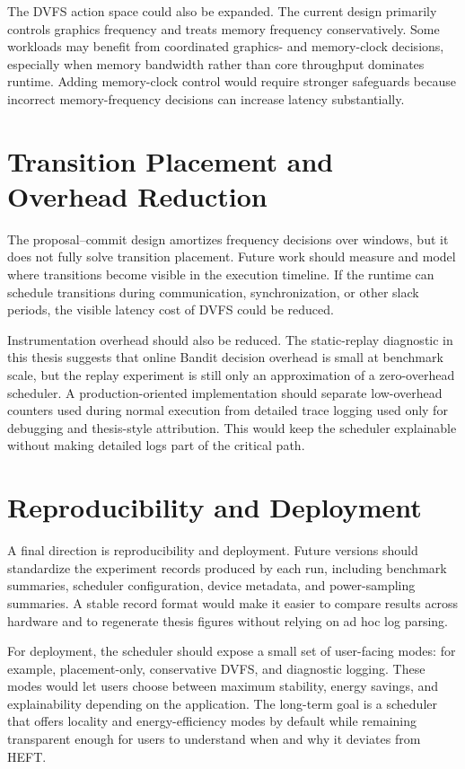 The DVFS action space could also be expanded. The current design primarily
controls graphics frequency and treats memory frequency conservatively. Some
workloads may benefit from coordinated graphics- and memory-clock decisions,
especially when memory bandwidth rather than core throughput dominates
runtime. Adding memory-clock control would require stronger safeguards because
incorrect memory-frequency decisions can increase latency substantially.

\section{Transition Placement and Overhead Reduction}
\label{sec:future-overhead}

The proposal--commit design amortizes frequency decisions over windows, but it
does not fully solve transition placement. Future work should measure and model
where transitions become visible in the \CUDASTF{} execution timeline. If the
runtime can schedule transitions during communication, synchronization, or
other slack periods, the visible latency cost of DVFS could be reduced.

Instrumentation overhead should also be reduced. The static-replay diagnostic
in this thesis suggests that online Bandit decision overhead is small at
benchmark scale, but the replay experiment is still only an approximation of a
zero-overhead scheduler. A production-oriented implementation should separate
low-overhead counters used during normal execution from detailed trace logging
used only for debugging and thesis-style attribution. This would keep the
scheduler explainable without making detailed logs part of the critical path.

\section{Reproducibility and Deployment}
\label{sec:future-reproducibility}

A final direction is reproducibility and deployment. Future versions should
standardize the experiment records produced by each run, including benchmark
summaries, scheduler configuration, device metadata, and power-sampling
summaries. A stable record format would make it easier to compare results
across hardware and to regenerate thesis figures without relying on ad hoc log
parsing.

For deployment, the scheduler should expose a small set of user-facing modes:
for example, placement-only, conservative DVFS, and diagnostic logging. These
modes would let users choose between maximum stability, energy savings, and
explainability depending on the application. The long-term goal is a \CUDASTF{}
scheduler that offers locality and energy-efficiency modes by default while
remaining transparent enough for users to understand when and why it deviates
from HEFT.
